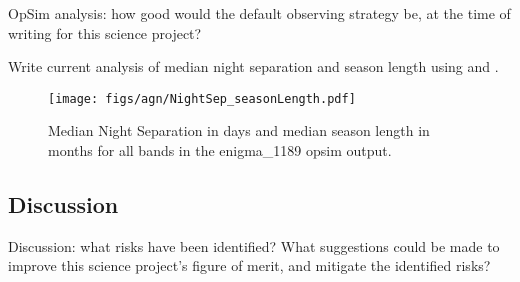 OpSim analysis: how good would the default observing strategy be, at
the time of writing for this science project?

 Write current analysis of median night separation and season length using  and . 

\begin{center}
\begin{figure}
\texttt{[image: figs/agn/NightSep\_seasonLength.pdf]}
\caption{Median Night Separation in days and median season length in months for all bands in the enigma\_1189 opsim output.}
\label{microfig}
\end{figure}
\end{center}


\subsection{Discussion}
\label{sec:\secname:discussion}

Discussion: what risks have been identified? What suggestions could be
made to improve this science project's figure of merit, and mitigate
the identified risks?



\navigationbar
